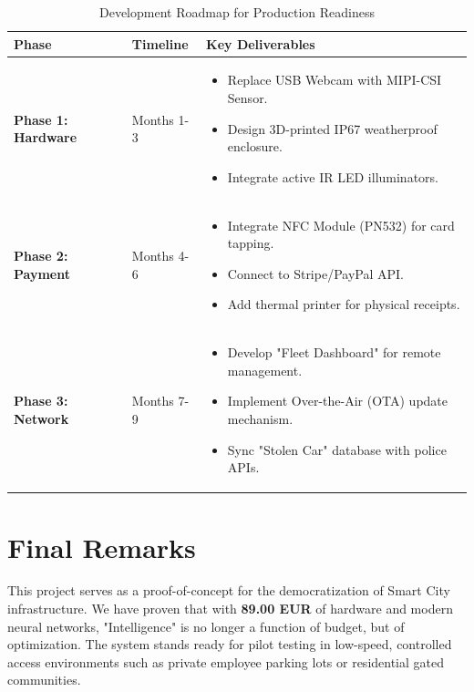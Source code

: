 \begin{table}[H]
	\centering
	\caption{Development Roadmap for Production Readiness}
	\label{tab:roadmap}
	\begin{tabular}{|l|l|l|}
		\hline
		\textbf{Phase} & \textbf{Timeline} & \textbf{Key Deliverables} \\ \hline
		\textbf{Phase 1: Hardware} & Months 1-3 & 
		\begin{minipage}[t]{6cm}
			\begin{itemize}
				\item Replace USB Webcam with MIPI-CSI Sensor.
				\item Design 3D-printed IP67 weatherproof enclosure.
				\item Integrate active IR LED illuminators.
			\end{itemize} 
		\end{minipage} \\ \hline
		
		\textbf{Phase 2: Payment} & Months 4-6 & 
		\begin{minipage}[t]{6cm}
			\begin{itemize}
				\item Integrate NFC Module (PN532) for card tapping.
				\item Connect to Stripe/PayPal API.
				\item Add thermal printer for physical receipts.
			\end{itemize} 
		\end{minipage} \\ \hline
		
		\textbf{Phase 3: Network} & Months 7-9 & 
		\begin{minipage}[t]{6cm}
			\begin{itemize}
				\item Develop "Fleet Dashboard" for remote management.
				\item Implement Over-the-Air (OTA) update mechanism.
				\item Sync "Stolen Car" database with police APIs.
			\end{itemize} 
		\end{minipage} \\ \hline
	\end{tabular}
\end{table}

\section{Final Remarks}
This project serves as a proof-of-concept for the democratization of Smart City infrastructure. We have proven that with \textbf{89.00 EUR} of hardware and modern neural networks, "Intelligence" is no longer a function of budget, but of optimization. The system stands ready for pilot testing in low-speed, controlled access environments such as private employee parking lots or residential gated communities.